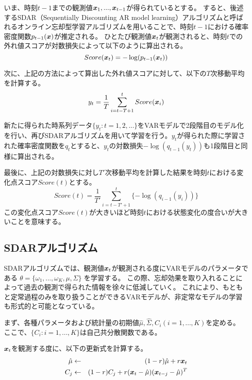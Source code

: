 いま、時刻$t-1$までの観測値$\mbox{\boldmath $x$}_1,...,\mbox{\boldmath $x$}_{t-1}$が得られているとする。
すると、後述するSDAR（Sequentially Discounting AR model learning）アルゴリズムと呼ばれるオンライン忘却型学習アルゴリズムを用いることで、時刻$t-1$における確率密度関数$p_{t-1}(\mbox{\boldmath $x$})$が推定される。
ひとたび観測値$\mbox{\boldmath $x$}_t$が観測されると、時刻$t$での外れ値スコアが対数損失によって以下のように算出される。
\begin{equation}
Score(\mbox{\boldmath $x$}_t) = -\log(p_{t-1}(\mbox{\boldmath $x$}_t))
\end{equation}

次に、上記の方法によって算出した外れ値スコアに対して、以下の$T$次移動平均を計算する。
\begin{equation}
y_t = \frac{1}{T}\sum_{i=t-T+1}^{t}{Score(\mbox{\boldmath $x$}_i)}
\end{equation}

新たに得られた時系列データ$\{y_t:t=1,2,...\}$をVARモデルで2段階目のモデル化を行い、再びSDARアルゴリズムを用いて学習を行う。$y_{t}$が得られた際に学習された確率密度関数を$q_{t}$とすると、$y_t$の対数損失$-\log(q_{t-1}(y_t))$も1段階目と同様に算出される。

最後に、上記の対数損失に対し$T'$次移動平均を計算した結果を時刻$t$における変化点スコア$Score(t)$とする。
\begin{equation}
Score(t) = \frac{1}{T'}\sum_{i=t-T'+1}^{t}{\{-\log(q_{i-1}(y_i))\}}
\end{equation}
この変化点スコア$Score(t)$が大きいほど時刻$t$における状態変化の度合いが大きいことを意味する。

\subsection{SDARアルゴリズム}
SDARアルゴリズムでは、観測値$\mbox{\boldmath $x$}_t$が観測される度にVARモデルのパラメータである
\begin{math}
\theta = \{\omega_1,..., \omega_K, \mu, \Sigma\}
\end{math}
を学習する。
この際、忘却効果を取り入れることによって過去の観測で得られた情報を徐々に低減していく。
これにより、もともと定常過程のみを取り扱うことができるVARモデルが、非定常なモデルの学習も形式的と可能となっている。

まず、各種パラメータおよび統計量の初期値$\hat{\mu},\hat{\Sigma},C_i(i=1,...,K)$を定める。
ここで、$\{C_i:i=1,...,K\}$は自己共分散関数である。

$\mbox{\boldmath $x$}_t$を観測する度に、以下の更新式を計算する。
\begin{eqnarray}
\label{eq:str}
\hat{\mu}&\leftarrow& (1-r)\hat{\mu}+r\mbox{\boldmath $x$}_t\\
C_j&\leftarrow& (1-r)C_j+r(\mbox{\boldmath $x$}_t-\hat{\mu})(\mbox{\boldmath $x$}_{t-j}-\hat{\mu})^T
\end{eqnarray}

